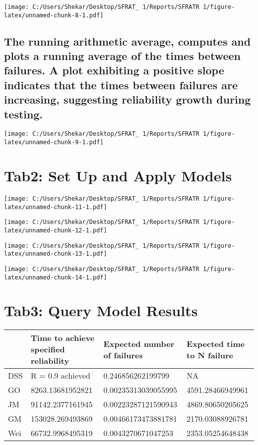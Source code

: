 \documentclass[]{article}
\begin{document}
\texttt{[image: C:/Users/Shekar/Desktop/SFRAT\_~1/Reports/SFRATR~1/figure-latex/unnamed-chunk-8-1.pdf]}

\subsection{The running arithmetic average, computes and plots a running
average of the times between failures. A plot exhibiting a positive
slope indicates that the times between failures are increasing,
suggesting reliability growth during
testing.}\label{the-running-arithmetic-average-computes-and-plots-a-running-average-of-the-times-between-failures.-a-plot-exhibiting-a-positive-slope-indicates-that-the-times-between-failures-are-increasing-suggesting-reliability-growth-during-testing.}

\texttt{[image: C:/Users/Shekar/Desktop/SFRAT\_~1/Reports/SFRATR~1/figure-latex/unnamed-chunk-9-1.pdf]}

\section{Tab2: Set Up and Apply
Models}\label{tab2-set-up-and-apply-models}

\texttt{[image: C:/Users/Shekar/Desktop/SFRAT\_~1/Reports/SFRATR~1/figure-latex/unnamed-chunk-11-1.pdf]}

\texttt{[image: C:/Users/Shekar/Desktop/SFRAT\_~1/Reports/SFRATR~1/figure-latex/unnamed-chunk-12-1.pdf]}

\texttt{[image: C:/Users/Shekar/Desktop/SFRAT\_~1/Reports/SFRATR~1/figure-latex/unnamed-chunk-13-1.pdf]}

\texttt{[image: C:/Users/Shekar/Desktop/SFRAT\_~1/Reports/SFRATR~1/figure-latex/unnamed-chunk-14-1.pdf]}

\section{Tab3: Query Model Results}\label{tab3-query-model-results}

\begin{longtable}[]{@{}llll@{}}
\toprule
& Time to achieve specified reliability & Expected number of failures &
Expected time to N failure\tabularnewline
\midrule
\endhead
DSS & R = 0.9 achieved & 0.246856262199799 & NA\tabularnewline
GO & 8263.13681952821 & 0.00235313039055995 &
4591.28466949961\tabularnewline
JM & 91142.2377161945 & 0.00223287121590943 &
4869.80650205625\tabularnewline
GM & 153028.269493869 & 0.00466173473881781 &
2170.03088926781\tabularnewline
Wei & 66732.9968495319 & 0.0043270671047253 &
2353.05254648438\tabularnewline
\bottomrule
\end{longtable}
\end{document}
